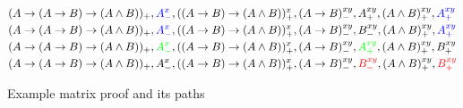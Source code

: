 \documentclass[twoside]{report}
\begin{document}
\begin{figure}[ht]
    \centering
    \vspace{1em}
    \vspace{1em}
    \begin{framed}
        $$
            \begin{aligned}
                 & (A \to (A \to B) \to (A \land B))_+,
                \textcolor{blue}{A^x_-},
                ((A \to B) \to (A \land B))^x_+,
                                                (A \to B)^{xy}_-,
                A^{xy}_+,
                    (A \land B)^{xy}_+,
                \textcolor{blue}{A^{xy}_+}
                \\
                 & (A \to (A \to B) \to (A \land B))_+,
                \textcolor{blue}{A^x_-},
                ((A \to B) \to (A \land B))^x_+,
                                                (A \to B)^{xy}_-,
                B^{xy}_-,
                    (A \land B)^{xy}_+,
                \textcolor{blue}{A^{xy}_+}
                \\
                 & (A \to (A \to B) \to (A \land B))_+,
                \textcolor{green}{A^x_-},
                ((A \to B) \to (A \land B))^x_+,
                                                (A \to B)^{xy}_-,
                \textcolor{green}{A^{xy}_+},
                (A \land B)^{xy}_+,
                B^{xy}_+
                \\
                 & (A \to (A \to B) \to (A \land B))_+,
                A^x_-,
                ((A \to B) \to (A \land B))^x_+,
                                                (A \to B)^{xy}_-,
                \textcolor{red}{B^{xy}_-},
                (A \land B)^{xy}_+,
                \textcolor{red}{B^{xy}_+}
                \\
            \end{aligned}
        $$
    \end{framed}
    \caption{Example matrix proof and its paths}
    \label{fig:example_matrix}
\end{figure}
\end{document}
